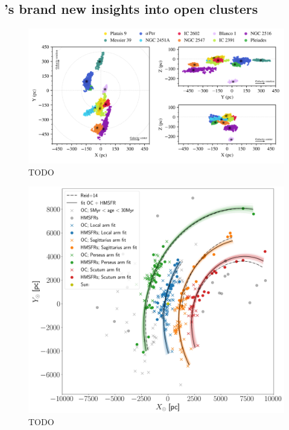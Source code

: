 \subsection{\gaia's brand new insights into open clusters}
\label{sec:intro:gaia:insights}

\begin{figure}[tb]
	\includegraphics[width=\textwidth]{fig/c1/meingast_tidal_tails.png}
	\caption[TODO]{TODO}
	\label{fig:intro:gaia:comas}
\end{figure}

\begin{figure}[tb]
	\includegraphics[width=\textwidth]{fig/c1/spiral_arms.png}
	\caption[TODO]{TODO}
	\label{fig:intro:gaia:spiral}
\end{figure}



